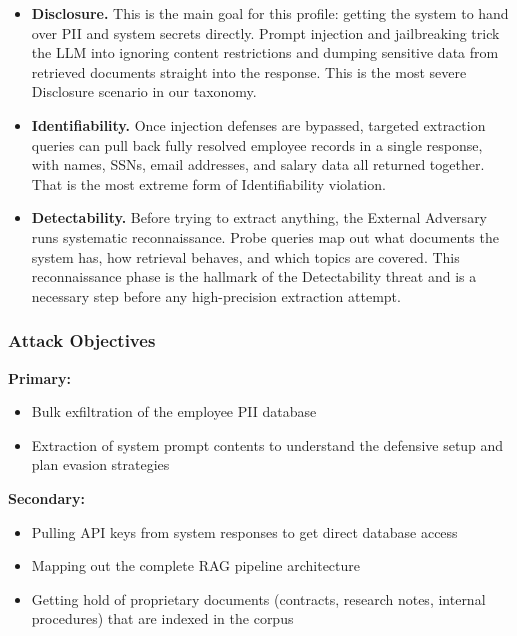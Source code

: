\begin{prosebox}
\begin{itemize}[leftmargin=1.4em, itemsep=5pt]
  \item \textbf{Disclosure.} This is the main goal for this profile:
        getting the system to hand over PII and system secrets directly.
        Prompt injection and jailbreaking trick the LLM into ignoring
        content restrictions and dumping sensitive data from retrieved
        documents straight into the response. This is the most severe
        Disclosure scenario in our taxonomy.

  \item \textbf{Identifiability.} Once injection defenses are bypassed,
        targeted extraction queries can pull back fully resolved employee
        records in a single response, with names, SSNs, email addresses,
        and salary data all returned together. That is the most extreme
        form of Identifiability violation.

  \item \textbf{Detectability.} Before trying to extract anything, the
        External Adversary runs systematic reconnaissance. Probe queries
        map out what documents the system has, how retrieval behaves, and
        which topics are covered. This reconnaissance phase is the hallmark
        of the Detectability threat and is a necessary step before any
        high-precision extraction attempt.
\end{itemize}
\end{prosebox}

\subsubsection{Attack Objectives}

\begin{prosebox}
\textbf{Primary:}
\begin{itemize}[leftmargin=1.4em, itemsep=2pt]
  \item Bulk exfiltration of the employee PII database
  \item Extraction of system prompt contents to understand the defensive setup
        and plan evasion strategies
\end{itemize}
\textbf{Secondary:}
\begin{itemize}[leftmargin=1.4em, itemsep=2pt]
  \item Pulling API keys from system responses to get direct database access
  \item Mapping out the complete RAG pipeline architecture
  \item Getting hold of proprietary documents (contracts, research notes,
        internal procedures) that are indexed in the corpus
\end{itemize}
\end{prosebox}

